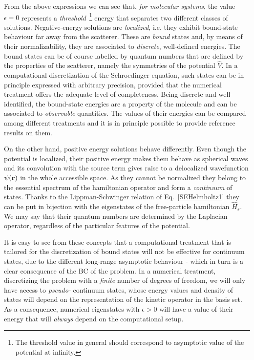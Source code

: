 \documentclass[reprint,aps,prb]{revtex4-1}
\renewcommand{\r}{{\bf r}}
\newcommand{\op}[1]{\hat {#1}}
\begin{document}
From the above expressions we can see that, \emph{for molecular systems},
the value $\epsilon=0$
represents a \emph{threshold}~\footnote{The threshold value in general should correspond to asymptotic value of the potential at infinity.} 
energy that separates two different classes of solutions.
Negative-energy solutions are \emph{localized}, i.e. they exhibit bound-state behaviour far away from the scatterer.
These are \emph{bound} states and, by means of their normalizability, they are associated to \emph{discrete}, well-defined energies.
The bound states can be of course labelled by quantum numbers that are defined by the properties of the scatterer, namely the
symmetries of the potential $\op V$.
In a computational discretization of the Schroedinger equation, such states can be in principle expressed with arbitrary precision, 
provided that the numerical treatment offers the adequate level of completeness. 
Being discrete and well-identified, the bound-state energies are a property of the molecule and can be associated to \emph{observable}
quantities. The values of their energies can be compared among different treatments and it is in principle possible to
provide reference results on them.


On the other hand, positive energy solutions behave differently. 
Even though the potential is localized, their positive energy makes them behave 
as spherical waves and its convolution with the source term  gives raise to a delocalized wavefunction $\psi(\r)$ 
in the whole accessible space.
As they cannot be normalized they belong to the essential spectrum of the hamiltonian operator and form a \emph{continuum} of states.
Thanks to the Lippman-Schwinger relation of Eq.~\eqref{SEHelmholtz1} they can be put in bijection with the eigenstates of the 
free-particle hamiltonian $\op H_s$. We may say that their quantum numbers are determined by the Laplacian operator, 
regardless of the particular features of the potential.

It is easy to see from these concepts that a computational treatment that is tailored for the discretization of bound states
will not be effective for continuum states, due to the different long-range asymptotic behaviour - which in turn is a clear consequence of the 
BC of the problem. In a numerical treatment, discretizing the problem with a \emph{finite}
number of degrees of freedom, we will only have access to \emph{pseudo-} continuum states,
whose energy values and density of states will depend on the representation of the kinetic operator
in the basis set. As a consequence, numerical eigenstates with $\epsilon > 0$ will have a value of their energy that will \emph{always}
depend on the computational setup.
\end{document}
